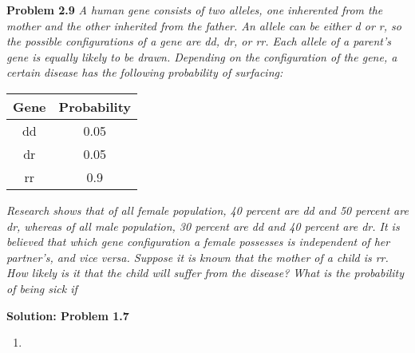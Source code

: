 \documentclass[12pt,twoside]{article}
\numberwithin{equation}{section}
\begin{document}
\noindent \textbf{Problem 2.9} \textit{A human gene consists of two alleles, one inherented from the mother and the other inherited from the father. An allele can be either d or r, so the possible configurations of a gene are dd, dr, or rr. Each allele of a parent’s gene is equally likely to be drawn. Depending on the configuration of the gene, a certain disease has the following probability of surfacing:}
	
\begin{table}[thpb!]
	\begin{tabular}{c|c}
		Gene & Probability \\
		\hline
		dd & 0.05 \\
		\hline
		dr & 0.05 \\
		\hline
		rr & 0.9 \\
	\end{tabular}
\end{table}

\textit{Research shows that of all female population, 40 percent are dd and 50 percent are dr, whereas of all male population, 30 percent are dd and 40 percent are dr. It is believed that which gene configuration a female possesses is independent of her partner’s, and vice versa. Suppose it is known that the mother of a child is rr. How likely is it that the child will suffer from the disease? What is the probability of being sick if }\clearpage

\noindent \textbf{Solution: Problem 1.7} 
\begin{enumerate}
	\item 
\end{enumerate}
\end{document}
